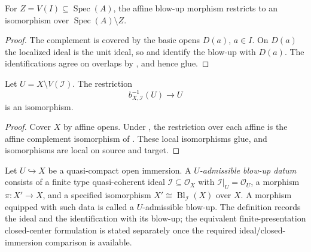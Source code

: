 \begin{lemma}
  \label{lemma:nagata-affine-blowup-complement}
  \leanok

  For $Z=V(I)\subseteq\operatorname{Spec}(A)$, the affine blow-up morphism
  restricts to an isomorphism over $\operatorname{Spec}(A)\setminus Z$.
\end{lemma}

\begin{proof}
  \leanok
  The complement is covered by the basic opens $D(a)$, $a\in I$.  On $D(a)$
  the localized ideal is the unit ideal, so
   and
   identify the blow-up with $D(a)$.
  The identifications agree on overlaps by
  , and hence glue.
\end{proof}

\begin{theorem}
  \label{thm:nagata-global-blowup-complement}
  \leanok

  Let $U=X\setminus V(\mathcal I)$.  The restriction
  \[
    b_{X,\mathcal I}^{-1}(U)\longrightarrow U
  \]
  is an isomorphism.
\end{theorem}

\begin{proof}
  \leanok
  Cover $X$ by affine opens.  Under
  , the restriction over each
  affine is the affine complement isomorphism of
  .  These local isomorphisms glue,
  and isomorphisms are local on source and target.
\end{proof}

\begin{definition}
  \label{def:nagata-admissible-blowup}
  \leanok

  Let $U\hookrightarrow X$ be a quasi-compact open immersion.  A
  \emph{$U$-admissible blow-up datum} consists of a finite type
  quasi-coherent ideal $\mathcal I\subseteq\mathcal O_X$ with
  $\mathcal I|_U=\mathcal O_U$, a morphism
  $\pi\colon X'\to X$, and a specified isomorphism
  $X'\cong\operatorname{Bl}_{\mathcal I}(X)$ over $X$.  A morphism equipped
  with such data is called a $U$-admissible blow-up.  The definition records
  the ideal and the identification with its blow-up; the equivalent
  finite-presentation closed-center formulation is stated separately once
  the required ideal/closed-immersion comparison is available.
\end{definition}

